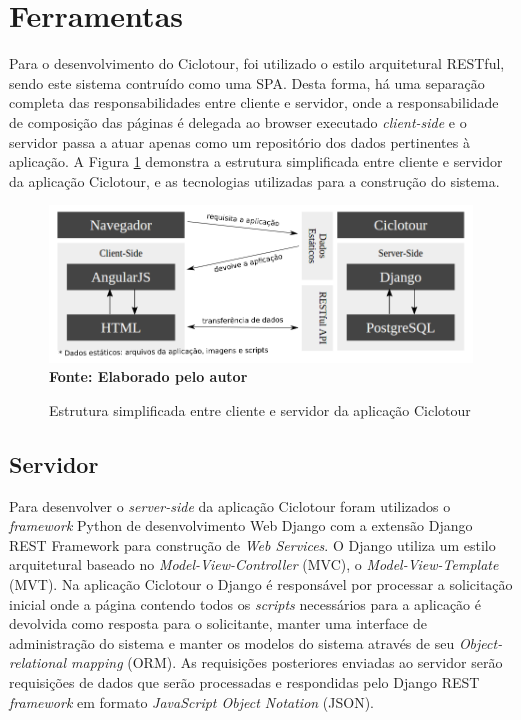 \section{\esp Ferramentas}
Para o desenvolvimento do Ciclotour, foi utilizado o estilo arquitetural RESTful, sendo este sistema contruído como uma SPA. Desta forma, há
uma separação completa das responsabilidades entre cliente e servidor, onde a responsabilidade de composição das páginas é delegada ao browser
executado \textit{client-side} e o servidor passa a atuar apenas como um repositório dos dados pertinentes à aplicação. A Figura 
\ref{fig:estruturaCiclotour} demonstra a estrutura simplificada entre cliente e servidor da aplicação Ciclotour, e as tecnologias utilizadas para
a construção do sistema.

\begin{figure}[!ht]
	\centering	
	\caption[\hspace{0.1cm} Estrutura simplificada entre cliente e servidor da aplicação Ciclotour.]
	{Estrutura simplificada entre cliente e servidor da aplicação Ciclotour}
	  \vspace{-0.4cm}
	\includegraphics[width=1\textwidth]{figuras/estruturaCiclotour.png}
	 \vspace{-0.3cm}
	\\\textbf{\footnotesize Fonte: Elaborado pelo autor}
	\label{fig:estruturaCiclotour}
\end{figure}

\subsection{Servidor}
Para desenvolver o \textit{server-side} da aplicação Ciclotour foram utilizados o \textit{framework} Python de desenvolvimento Web Django com a 
extensão Django REST Framework para construção de \textit{Web Services}. O Django utiliza um estilo arquitetural baseado no 
\textit{Model-View-Controller} (MVC), o \textit{Model-View-Template} (MVT). Na aplicação Ciclotour o Django é responsável por processar a 
solicitação inicial onde a página contendo todos os \textit{scripts} necessários para a aplicação é devolvida como resposta para o solicitante,
manter uma interface de administração do sistema e manter os modelos do sistema através de seu \textit{Object-relational mapping} (ORM). 
As requisições posteriores enviadas ao servidor serão requisições de dados que serão processadas e respondidas pelo Django REST \textit{framework} 
em formato \textit{JavaScript Object Notation} (JSON).

